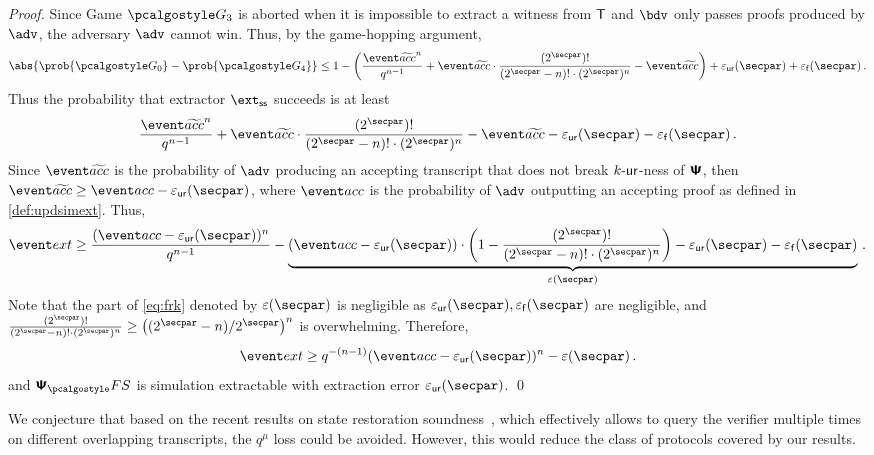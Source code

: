 \begin{proof}
		Since Game $\game{3}$ is aborted when it is impossible to extract a witness from
		$\mathsf{T}$ and $\bdv$ only passes proofs produced by $\adv$, the adversary $\advse$ cannot
		win. Thus, by the game-hopping argument,
		\[
		\abs{\prob{\game{0}} - \prob{\game{4}}} \leq 1 -
		\left(\frac{\waccProb^{n}}{q^{n - 1}} + \waccProb \cdot \frac{(2^\secpar)
			!}{(2^\secpar - n)! \cdot (2^\secpar)^{n}} - \waccProb\right) + \epsur(\secpar) +
		\epsss(\secpar)\,.
		\]
		Thus the probability that extractor $\extss$ succeeds is at least
		\[
		\frac{\waccProb^{n}}{q^{n - 1}} + \waccProb \cdot \frac{(2^\secpar)
			!}{(2^\secpar - n)! \cdot (2^\secpar)^{n}} - \waccProb - \epsur(\secpar) 
		- \epsss(\secpar)\,.
		\]
		Since $\waccProb$ is the probability of $\advse$ producing an accepting transcript
		that does not break ${k\text{-}\mathsf{ur}}$-ness of $\bm{\mathsf{\Psi}}$, then $\waccProb \geq \accProb -
		\epsur(\secpar)$, where $\accProb$ is the probability of $\advse$ outputting an accepting
		proof as defined in \cref{def:updsimext}. Thus, 
		\begin{equation}
		\label{eq:frk}
		\extProb \geq \frac{(\accProb - \epsur(\secpar))^{n}}{q^{n - 1}} -
		\underbrace{(\accProb - \epsur(\secpar)) \cdot \left( 1 - \frac{(2^\secpar)
				!}{(2^\secpar - n)! \cdot (2^\secpar)^{n}}\right) - \epsur(\secpar) -
			\epsss(\secpar)}_{\eps(\secpar)}\,.
		\end{equation}
		Note that the part of \cref{eq:frk} denoted by $\eps(\secpar)$ is negligible as
		$\epsur(\secpar), \epsss(\secpar)$ are negligible, and
		$\frac{(2^\secpar) !}{(2^\secpar - n)! \cdot (2^\secpar)^{n}} \geq
		\left(\infrac{(2^\secpar - n)}{2^\secpar}\right)^{n}$ is overwhelming.  Therefore,
		\[
		\extProb \geq q^{-(n - 1)} (\accProb - \epsur(\secpar))^{n} -\eps(\secpar)\,.
		\] 
		and $\psfs$ is simulation extractable with extraction error $\epsur(\secpar)$.
	\qed
\end{proof}


We conjecture that based on the recent results on state restoration soundness~\cite{C:GhoTes21}, which effectively allows to query the verifier multiple times on different overlapping transcripts, the $q^{\mu}$ loss could be avoided. However, this would reduce the class of protocols covered by our results. 

